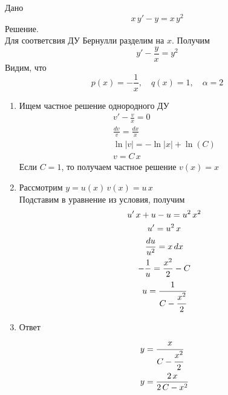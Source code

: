 \begin{Example}
    Дано
    \[
        x\,y'-y=x\,y^2
    \]
    Решение.\\
    Для соответсвия ДУ Бернулли разделим на $x$. Получим
    \[
        y'-\frac{y}{x}=y^2
    \]
    Видим, что
    \[
        p(x)=-\frac{1}{x}, \quad q(x)=1, \quad \alpha=2
    \]
    \begin{enumerate}
        \item Ищем частное решение однородного ДУ 
        \begin{gather*}
            v'-\frac{v}{x}=0\\
            \frac{dv}{v}=\frac{dx}{x}\\
            \ln|v|= - \ln|x|+ \ln(C)\\
            v=C\,x
        \end{gather*}
        Если $C=1$, то получаем частное решение $v(x)= x$
        
        \item Рассмотрим $y=u(x)\,v(x)=u\,x$\\
        Подставим в уравнение из условия, получим
        \begin{gather*}
            u'\,x+u-u=u^2\,x^2\\
            u'=u^2\,x\\
            \frac{du}{u^2}=x\,dx\\
            -\frac{1}{u}=\frac{x^2}{2} - C\\
            u = \cfrac{1}{C-\cfrac{x^2}{2}}
        \end{gather*}
        
        \item Ответ
            \begin{align*}
                y &= \cfrac{x}{C-\cfrac{x^2}{2}}\\
                y &= \frac{2\,x}{2\,C-x^2}
            \end{align*}
    \end{enumerate}
\end{Example}
















